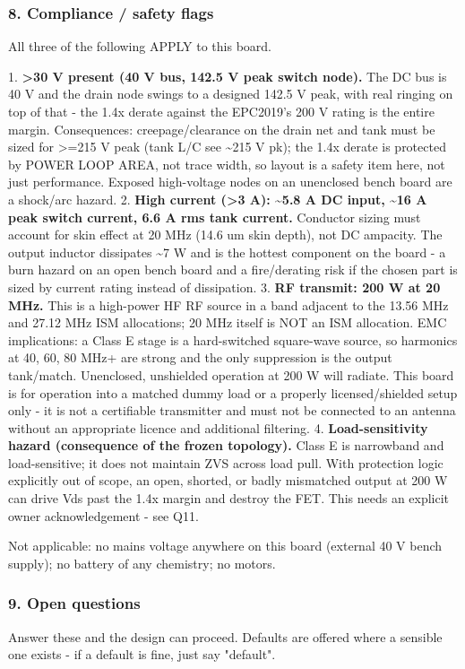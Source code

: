 \documentclass[11pt,a4paper]{article}
\begin{document}
\subsubsection*{8. Compliance / safety flags}
All three of the following APPLY to this board.

1. \textbf{\textgreater{}30 V present (40 V bus, 142.5 V peak switch node).} The DC bus is 40 V and the drain node swings to a designed 142.5 V peak, with real ringing on top of that - the 1.4x derate against the EPC2019's 200 V rating is the entire margin. Consequences: creepage/clearance on the drain net and tank must be sized for \textgreater{}=215 V peak (tank L/C see \textasciitilde{}215 V pk); the 1.4x derate is protected by POWER LOOP AREA, not trace width, so layout is a safety item here, not just performance. Exposed high-voltage nodes on an unenclosed bench board are a shock/arc hazard. 2. \textbf{High current (\textgreater{}3 A): \textasciitilde{}5.8 A DC input, \textasciitilde{}16 A peak switch current, 6.6 A rms tank current.} Conductor sizing must account for skin effect at 20 MHz (14.6 um skin depth), not DC ampacity. The output inductor dissipates \textasciitilde{}7 W and is the hottest component on the board - a burn hazard on an open bench board and a fire/derating risk if the chosen part is sized by current rating instead of dissipation. 3. \textbf{RF transmit: 200 W at 20 MHz.} This is a high-power HF RF source in a band adjacent to the 13.56 MHz and 27.12 MHz ISM allocations; 20 MHz itself is NOT an ISM allocation. EMC implications: a Class E stage is a hard-switched square-wave source, so harmonics at 40, 60, 80 MHz+ are strong and the only suppression is the output tank/match. Unenclosed, unshielded operation at 200 W will radiate. This board is for operation into a matched dummy load or a properly licensed/shielded setup only - it is not a certifiable transmitter and must not be connected to an antenna without an appropriate licence and additional filtering. 4. \textbf{Load-sensitivity hazard (consequence of the frozen topology).} Class E is narrowband and load-sensitive; it does not maintain ZVS across load pull. With protection logic explicitly out of scope, an open, shorted, or badly mismatched output at 200 W can drive Vds past the 1.4x margin and destroy the FET. This needs an explicit owner acknowledgement - see Q11.

Not applicable: no mains voltage anywhere on this board (external 40 V bench supply); no battery of any chemistry; no motors.

\subsubsection*{9. Open questions}
Answer these and the design can proceed. Defaults are offered where a sensible one exists - if a default is fine, just say "default".
\end{document}

